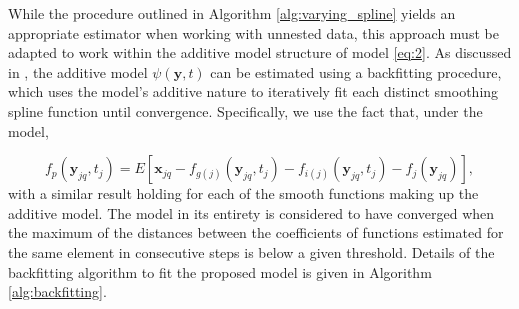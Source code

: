 \documentclass[11pt,reqno]{article}
\theoremstyle{definition}
\begin{document}
While the procedure outlined in Algorithm \ref{alg:varying_spline} yields an appropriate estimator when working with unnested data, this approach must be adapted to work within the additive model structure of model \ref{eq:2}. As discussed in \cite{hastieGeneralizedAdditiveModels1990}, the additive model $\psi(\mathbf{y}, t)$ can be estimated using a backfitting procedure, which uses the model's additive nature to iteratively fit each distinct smoothing spline function until convergence. Specifically, we use the fact that, under the model,

\[%
  f_p(\mathbf{y}_{jq}, t_{j}) = E\left[\mathbf{x}_{jq} - f_{g(j)}(\mathbf{y}_{jq}, t_{j}) - f_{i(j)}(\mathbf{y}_{jq}, t_{j}) - f_{j}(\mathbf{y}_{jq})\right]
,\]%
with a similar result holding for each of the smooth functions making up the additive model. The model in its entirety is considered to have converged when the maximum of the distances between the coefficients of functions estimated for the same element in consecutive steps is below a given threshold. Details of the backfitting algorithm to fit the proposed model is given in Algorithm \ref{alg:backfitting}.
\end{document}
